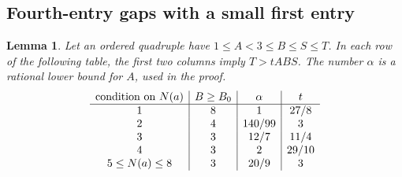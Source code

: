 \documentclass[12pt]{article}
\newtheorem{lemma}[theorem]{Lemma}
\numberwithin{equation}{section}
\begin{document}
\subsection{Fourth-entry gaps with a small first entry}

\begin{lemma}\label{lem:five-frontier-gaps}
Let an ordered quadruple have \(1\le A<3\le B\le S\le T\).
In each row of the following table, the first two columns imply
\(T>tABS\). The number \(\alpha\) is a rational lower bound for \(A\),
used in the proof.
\[
\begin{array}{c|c|c|c}
\hbox{condition on }N(a)&B\ge B_0&\alpha&t\\\hline
1&8&1&27/8\\
2&4&140/99&3\\
3&3&12/7&11/4\\
4&3&2&29/10\\
5\le N(a)\le8&3&20/9&3
\end{array}
\]
\end{lemma}
\end{document}
